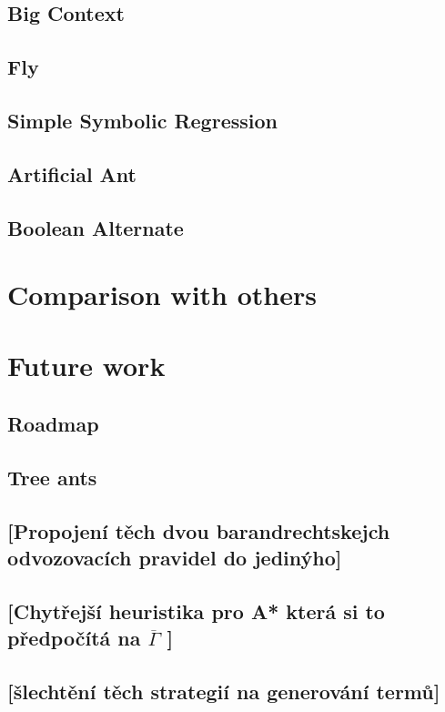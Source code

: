 \documentclass[12pt,a4paper]{report}
\begin{document}
		\section{Big Context}
		\section{Fly}
		\section{Simple Symbolic Regression}
		\section{Artificial Ant}
		\section{Boolean Alternate}
		
\chapter{Comparison with others}

\chapter{Future work}

\section{Roadmap}
\section{Tree ants}
\section{[Propojení těch dvou barandrechtskejch odvozovacích pravidel do jedinýho]}
\section{[Chytřejší heuristika pro A* která si to předpočítá na $\overline{\Gamma}$ ]}
\section{[šlechtění těch strategií na generování termů]}
\end{document}
